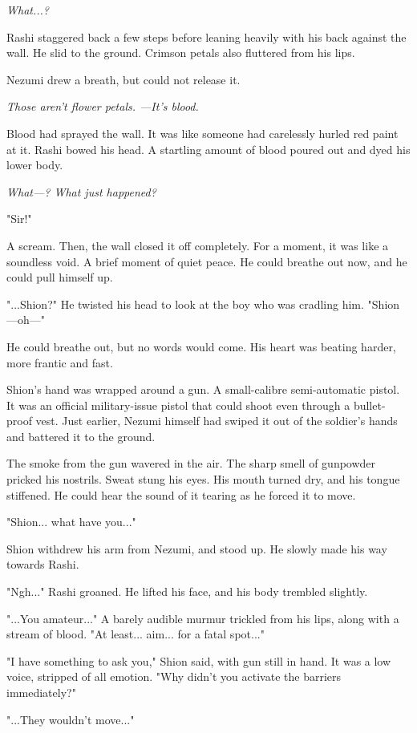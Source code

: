 \emph{What...?}

Rashi staggered back a few steps before leaning heavily with his back
against the wall. He slid to the ground. Crimson petals also fluttered
from his lips.

Nezumi drew a breath, but could not release it.

\emph{Those aren't flower petals. ---It's blood.}

Blood had sprayed the wall. It was like someone had carelessly hurled
red paint at it. Rashi bowed his head. A startling amount of blood
poured out and dyed his lower body.

\emph{What---? What just happened?}

"Sir!"

A scream. Then, the wall closed it off completely. For a moment, it was
like a soundless void. A brief moment of quiet peace. He could breathe
out now, and he could pull himself up.

"...Shion?" He twisted his head to look at the boy who was cradling him.
"Shion---oh---"

He could breathe out, but no words would come. His heart was beating
harder, more frantic and fast.

Shion's hand was wrapped around a gun. A small-calibre semi-automatic
pistol. It was an official military-issue pistol that could shoot even
through a bullet-proof vest. Just earlier, Nezumi himself had swiped it
out of the soldier's hands and battered it to the ground.

The smoke from the gun wavered in the air. The sharp smell of gunpowder
pricked his nostrils. Sweat stung his eyes. His mouth turned dry, and
his tongue stiffened. He could hear the sound of it tearing as he forced
it to move.

"Shion... what have you..."

Shion withdrew his arm from Nezumi, and stood up. He slowly made his way
towards Rashi.

"Ngh..." Rashi groaned. He lifted his face, and his body trembled
slightly.

"...You amateur..." A barely audible murmur trickled from his lips,
along with a stream of blood. "At least... aim... for a fatal spot..."

"I have something to ask you," Shion said, with gun still in hand. It
was a low voice, stripped of all emotion. "Why didn't you activate the
barriers immediately?"

"...They wouldn't move..."

